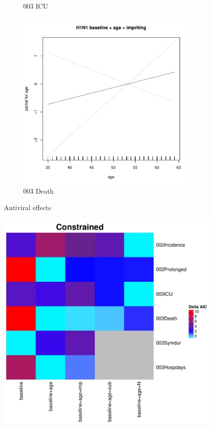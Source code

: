 \documentclass[12pt,twoside]{article}
\begin{document}
\begin{figure}[h]
\begin{subfigure}{.3\linewidth}
                \caption{003 ICU}
        \end{subfigure}
        \begin{subfigure}{.3\linewidth}
                \includegraphics[width=\textwidth, page=3]{003Death_constrained}
                \caption{003 Death}
        \end{subfigure}
        \caption{Antiviral effects}
        \end{figure}



    \begin{figure}[h]
        \centering
            \includegraphics[width=\textwidth, page=1]{AIC_summary_constrained}
        \end{figure}
        
\end{document}
